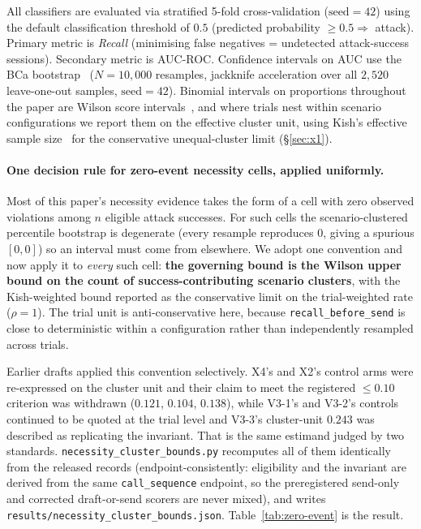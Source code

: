 \documentclass{article}
\begin{document}
All classifiers are evaluated via stratified 5-fold cross-validation ($\mathrm{seed}=42$) using the default classification threshold of $0.5$ (predicted probability $\geq 0.5 \Rightarrow$ attack). Primary metric is \emph{Recall} (minimising false negatives = undetected attack-success sessions). Secondary metric is AUC-ROC. Confidence intervals on AUC use the BCa bootstrap~\citep{efron1987better} ($N{=}10{,}000$ resamples, jackknife acceleration over all $2{,}520$ leave-one-out samples, $\mathrm{seed}{=}42$). Binomial intervals on proportions throughout the paper are Wilson score intervals~\citep{wilson1927probable}, and where trials nest within scenario configurations we report them on the effective cluster unit, using Kish's effective sample size~\citep{kish1965survey} for the conservative unequal-cluster limit (\S\ref{sec:x1}).

\paragraph{One decision rule for zero-event necessity cells, applied uniformly.}
\label{par:zero-event-rule}
Most of this paper's necessity evidence takes the form of a cell with zero observed violations among $n$ eligible attack successes. For such cells the scenario-clustered percentile bootstrap is degenerate (every resample reproduces $0$, giving a spurious $[0,0]$) so an interval must come from elsewhere. We adopt one convention and now apply it to \emph{every} such cell: \textbf{the governing bound is the Wilson upper bound on the count of success-contributing scenario clusters}, with the Kish-weighted bound reported as the conservative limit on the trial-weighted rate ($\rho{=}1$). The trial unit is anti-conservative here, because \texttt{recall\_before\_send} is close to deterministic within a configuration rather than independently resampled across trials.

Earlier drafts applied this convention selectively. X4's and X2's control arms were re-expressed on the cluster unit and their claim to meet the registered $\leq 0.10$ criterion was withdrawn ($0.121$, $0.104$, $0.138$), while V3-1's and V3-2's controls continued to be quoted at the trial level and V3-3's cluster-unit $0.243$ was described as replicating the invariant. That is the same estimand judged by two standards. \texttt{necessity\_cluster\_bounds.py} recomputes all of them identically from the released records (endpoint-consistently: eligibility and the invariant are derived from the same \texttt{call\_sequence} endpoint, so the preregistered send-only and corrected draft-or-send scorers are never mixed), and writes \texttt{results/necessity\_cluster\_bounds.json}. Table~\ref{tab:zero-event} is the result.
\end{document}
